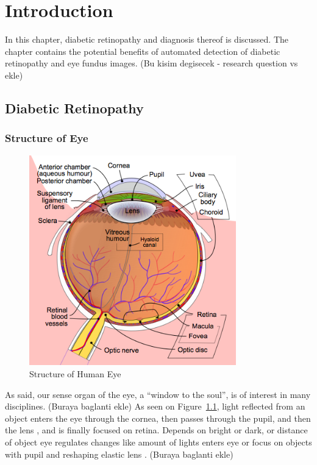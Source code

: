 \chapter{Introduction}
\label{intro}

In this chapter, diabetic retinopathy and diagnosis thereof is discussed. The chapter contains the potential benefits of automated detection of diabetic retinopathy and eye fundus images.  (Bu kisim degisecek - research question vs ekle)

\section{Diabetic Retinopathy}


\subsection{Structure of Eye}

\begin{figure}[t]
\centering
\includegraphics[width=0.8\textwidth]{Figures/structure_of_eye}
\caption{Structure of Human Eye \citep[from][]{WikipediaEN:AFM}}
\label{structureOfEye}
\end{figure}

As \citet{hughes2004anatomy} said, our sense organ of the eye, a ``window to the soul'', is of interest in many disciplines. (Buraya baglanti ekle) As seen on Figure~\ref{structureOfEye}, light reflected from an object enters the eye through the cornea, then passes through the pupil, and then the lens \citep{falt2012modern}, and is finally focused on retina. Depends on bright or dark, or distance of object eye regulates changes like amount of lights enters eye or focus on objects with pupil and reshaping elastic lens \citep{kauppi2010eye}. (Buraya baglanti ekle)

